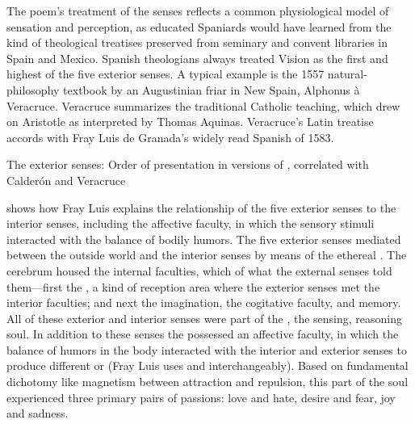 The poem's treatment of the senses reflects a common physiological model of 
sensation and perception, as educated Spaniards would have learned from the 
kind of theological treatises preserved from seminary and convent libraries in 
Spain and Mexico.
Spanish theologians always treated Vision as the first and highest of the five 
exterior senses.
A typical example is the 1557 natural-philosophy textbook  by an Augustinian friar in New Spain, Alphonus à Veracruce.%
    \Autocite{Veracruce:Phisica}
Veracruce summarizes the traditional Catholic teaching, which drew on Aristotle 
as interpreted by Thomas Aquinas.
Veracruce's Latin treatise accords with Fray Luis de Granada's widely read 
Spanish  of 1583.%
    \Autocites{LuisdeGranada:Simbolo}
    [(part I)]{LuisdeGranada-Balcells:SimboloPtI}

\begin{table}
    \caption{The exterior senses: Order of presentation in versions of 
    , correlated with Calderón and Veracruce}
    \label{table:senses-order}
\end{table}

 shows how Fray Luis explains the relationship 
of the five exterior senses to the interior senses, including the affective 
faculty, in which the sensory stimuli interacted with the balance of bodily 
humors.
The five exterior senses mediated between the outside world and the interior 
senses by means of the ethereal .
The cerebrum housed the internal faculties, which  of what 
the external senses told them---first the , a kind of 
reception area where the exterior senses met the interior faculties; and next 
the imagination, the cogitative faculty, and memory.
All of these exterior and interior senses were part of the , the sensing, reasoning soul.
In addition to these senses the  possessed an affective 
faculty, in which the balance of humors in the body interacted with the 
interior and exterior senses to produce different  or 
 (Fray Luis uses  and  
interchangeably).
Based on fundamental dichotomy like magnetism between attraction and repulsion, 
this  part of the soul experienced three primary pairs of 
passions: love and hate, desire and fear, joy and sadness.%
    \Autocite
    [pt.~I, ch.~27--35, pp.~439--494]{LuisdeGranada-Balcells:SimboloPtI}

